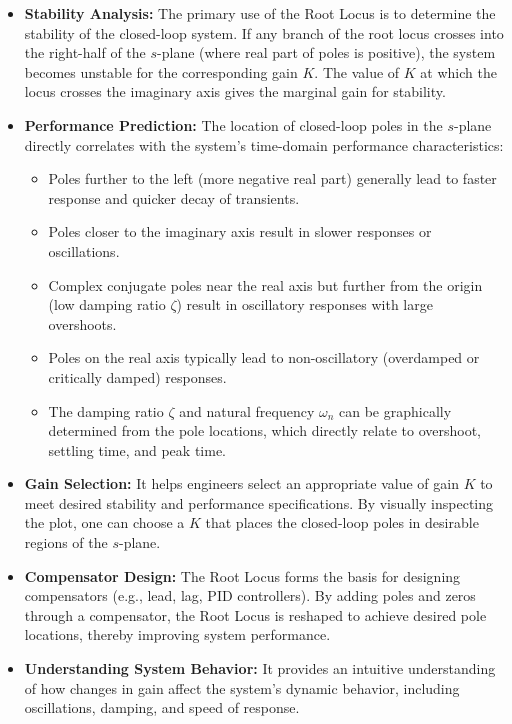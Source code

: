 \documentclass[a4paper,12pt]{article}
\begin{document}
\begin{itemize}
	\item \textbf{Stability Analysis:} The primary use of the Root Locus is to determine the stability of the closed-loop system. If any branch of the root locus crosses into the right-half of the $s$-plane (where real part of poles is positive), the system becomes unstable for the corresponding gain $K$. The value of $K$ at which the locus crosses the imaginary axis gives the marginal gain for stability.
	\item \textbf{Performance Prediction:} The location of closed-loop poles in the $s$-plane directly correlates with the system's time-domain performance characteristics:
	\begin{itemize}
		\item Poles further to the left (more negative real part) generally lead to faster response and quicker decay of transients.
		\item Poles closer to the imaginary axis result in slower responses or oscillations.
		\item Complex conjugate poles near the real axis but further from the origin (low damping ratio $\zeta$) result in oscillatory responses with large overshoots.
		\item Poles on the real axis typically lead to non-oscillatory (overdamped or critically damped) responses.
		\item The damping ratio $\zeta$ and natural frequency $\omega_n$ can be graphically determined from the pole locations, which directly relate to overshoot, settling time, and peak time.
	\end{itemize}
	\item \textbf{Gain Selection:} It helps engineers select an appropriate value of gain $K$ to meet desired stability and performance specifications. By visually inspecting the plot, one can choose a $K$ that places the closed-loop poles in desirable regions of the $s$-plane.
	\item \textbf{Compensator Design:} The Root Locus forms the basis for designing compensators (e.g., lead, lag, PID controllers). By adding poles and zeros through a compensator, the Root Locus is reshaped to achieve desired pole locations, thereby improving system performance.
	\item \textbf{Understanding System Behavior:} It provides an intuitive understanding of how changes in gain affect the system's dynamic behavior, including oscillations, damping, and speed of response.
\end{itemize}
\end{document}
